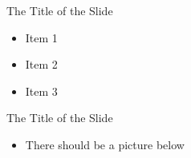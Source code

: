 \documentclass{prosper}
\begin{document}
\begin{slide}[Glitter]{The Title of the Slide}
\begin{itemize}
\item Item 1
\item Item 2
\item Item 3
\end{itemize}
\end{slide}

\begin{slide}{The Title of the Slide}
\begin{itemize}
\item There should be a picture below
\end{itemize}
\end{slide}
\end{document}
